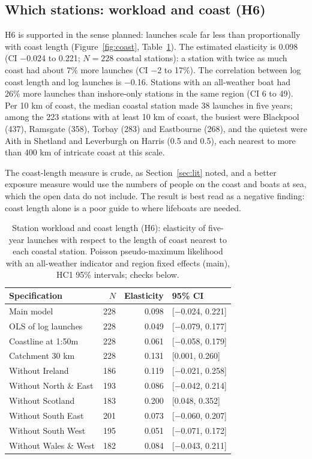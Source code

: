 \documentclass[11pt,a4paper]{article}
\begin{document}
\subsection{Which stations: workload and coast (H6)}
H6 is supported in the sense planned: launches scale far less than proportionally with coast length (Figure~\ref{fig:coast}, Table~\ref{tab:h6}). The estimated elasticity is 0.098 (CI $-$0.024 to 0.221; $N = 228$ coastal stations): a station with twice as much coast had about 7\% more launches (CI $-$2 to 17\%). The correlation between log coast length and log launches is $-$0.16. Stations with an all-weather boat had 26\% more launches than inshore-only stations in the same region (CI 6 to 49). Per 10 km of coast, the median coastal station made 38 launches in five years; among the 223 stations with at least 10 km of coast, the busiest were Blackpool (437), Ramsgate (358), Torbay (283) and Eastbourne (268), and the quietest were Aith in Shetland and Leverburgh on Harris (0.5 and 0.5), each nearest to more than 400 km of intricate coast at this scale.

The coast-length measure is crude, as Section~\ref{sec:lit} noted, and a better exposure measure would use the numbers of people on the coast and boats at sea, which the open data do not include. The result is best read as a negative finding: coast length alone is a poor guide to where lifeboats are needed.

\begin{table}[tbp]\centering\small\caption{Station workload and coast length (H6): elasticity of five-year launches with respect to the length of coast nearest to each coastal station. Poisson pseudo-maximum likelihood with an all-weather indicator and region fixed effects (main), HC1 95\% intervals; checks below.}\label{tab:h6}\begin{tabular}{lrrl}\toprule Specification & $N$ & Elasticity & 95\% CI\\\midrule
Main model & 228 & 0.098 & [$-$0.024, 0.221]\\
OLS of log launches & 228 & 0.049 & [$-$0.079, 0.177]\\
Coastline at 1:50m & 228 & 0.061 & [$-$0.058, 0.179]\\
Catchment 30 km & 228 & 0.131 & [0.001, 0.260]\\
Without Ireland & 186 & 0.119 & [$-$0.021, 0.258]\\
Without North \& East & 193 & 0.086 & [$-$0.042, 0.214]\\
Without Scotland & 183 & 0.200 & [0.048, 0.352]\\
Without South East & 201 & 0.073 & [$-$0.060, 0.207]\\
Without South West & 195 & 0.051 & [$-$0.071, 0.172]\\
Without Wales \& West & 182 & 0.084 & [$-$0.043, 0.211]\\
\bottomrule\end{tabular}\end{table}
\end{document}
